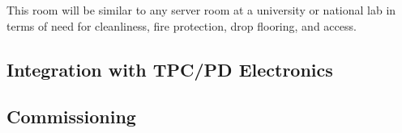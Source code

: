 This room will be similar to any server room at a university or national
lab in terms of need for cleanliness, fire protection, drop flooring,
and access.

\subsection{Integration with TPC/PD Electronics}
\label{sec:fdsp-daq-install-transport}


\subsection{Commissioning}
\label{sec:fdsp-daq-commissioning}


%


%
%
%
%
%

